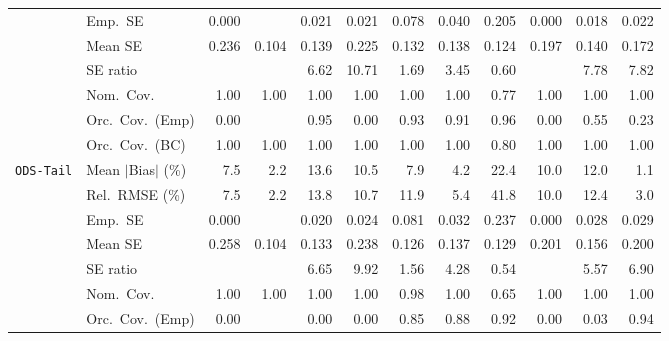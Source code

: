 \begin{landscape}
\begin{longtable}{llrrrrrrrrrr}
 & Emp.\ SE & 0.000 &  & 0.021 & 0.021 & 0.078 & 0.040 & 0.205 & 0.000 & 0.018 & 0.022 \\
 & Mean SE & 0.236 & 0.104 & 0.139 & 0.225 & 0.132 & 0.138 & 0.124 & 0.197 & 0.140 & 0.172 \\
 & SE ratio &  &  & 6.62 & 10.71 & \cellcolor{ranktwo}1.69 & \cellcolor{rankthree}3.45 & \cellcolor{rankone}0.60 &  & 7.78 & 7.82 \\
 & Nom.\ Cov. & \cellcolor{rankone}1.00 & \cellcolor{rankone}1.00 & \cellcolor{rankone}1.00 & \cellcolor{rankone}1.00 & \cellcolor{rankone}1.00 & \cellcolor{rankone}1.00 & \cellcolor{ranktwo}0.77 & \cellcolor{rankone}1.00 & \cellcolor{rankone}1.00 & \cellcolor{rankone}1.00 \\
 & Orc.\ Cov.\ (Emp) & 0.00 &  & \cellcolor{rankone}0.95 & 0.00 & \cellcolor{rankthree}0.93 & 0.91 & \cellcolor{ranktwo}0.96 & 0.00 & 0.55 & 0.23 \\
 & Orc.\ Cov.\ (BC) & \cellcolor{rankone}1.00 & \cellcolor{rankone}1.00 & \cellcolor{rankone}1.00 & \cellcolor{rankone}1.00 & \cellcolor{rankone}1.00 & \cellcolor{rankone}1.00 & \cellcolor{ranktwo}0.80 & \cellcolor{rankone}1.00 & \cellcolor{rankone}1.00 & \cellcolor{rankone}1.00 \\
\addlinespace[2pt]
\quad \texttt{ODS-Tail} & Mean $|$Bias$|$ (\%) & 7.5 & \cellcolor{ranktwo}2.2 & 13.6 & 10.5 & 7.9 & \cellcolor{rankthree}4.2 & 22.4 & 10.0 & 12.0 & \cellcolor{rankone}1.1 \\
 & Rel.\ RMSE (\%) & 7.5 & \cellcolor{rankone}2.2 & 13.8 & 10.7 & 11.9 & \cellcolor{rankthree}5.4 & 41.8 & 10.0 & 12.4 & \cellcolor{ranktwo}3.0 \\
 & Emp.\ SE & 0.000 &  & 0.020 & 0.024 & 0.081 & 0.032 & 0.237 & 0.000 & 0.028 & 0.029 \\
 & Mean SE & 0.258 & 0.104 & 0.133 & 0.238 & 0.126 & 0.137 & 0.129 & 0.201 & 0.156 & 0.200 \\
 & SE ratio &  &  & 6.65 & 9.92 & \cellcolor{ranktwo}1.56 & \cellcolor{rankthree}4.28 & \cellcolor{rankone}0.54 &  & 5.57 & 6.90 \\
 & Nom.\ Cov. & \cellcolor{ranktwo}1.00 & \cellcolor{ranktwo}1.00 & \cellcolor{ranktwo}1.00 & \cellcolor{ranktwo}1.00 & \cellcolor{rankone}0.98 & \cellcolor{ranktwo}1.00 & \cellcolor{rankthree}0.65 & \cellcolor{ranktwo}1.00 & \cellcolor{ranktwo}1.00 & \cellcolor{ranktwo}1.00 \\
 & Orc.\ Cov.\ (Emp) & 0.00 &  & 0.00 & 0.00 & 0.85 & \cellcolor{rankthree}0.88 & \cellcolor{ranktwo}0.92 & 0.00 & 0.03 & \cellcolor{rankone}0.94 \\

\end{longtable}
\end{landscape}
